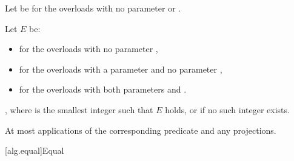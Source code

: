 \begin{itemdescr}
\pnum
Let  be  for the overloads with no parameter  or .

\pnum
Let $E$ be:
\begin{itemize}
\item {} for the overloads with no parameter ,
\item {} for the overloads with a parameter  and no parameter ,
\item {} for the overloads with both parameters  and .
\end{itemize}

\pnum
\returns
{}, where  is the smallest integer
such that $E$ holds,
or  if no such integer exists.

\pnum
\complexity
At most
applications of the corresponding predicate and any projections.
\end{itemdescr}

[alg.equal]{Equal}

